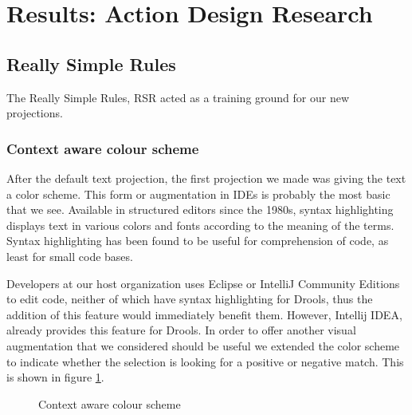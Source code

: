 \section{Results: Action Design Research}\label{section:Results_ADR}

\subsection{Really Simple Rules}

The Really Simple Rules, RSR acted as a training ground for our new projections.

\subsubsection{Context aware colour scheme}
After the default text projection, the first projection we made was giving the text a color scheme. 
This form or augmentation in IDEs is probably the most basic that we see. 
Available in structured editors since the 1980s\cite{cowlishaw1987lexx}, syntax highlighting displays text in various colors and fonts according to the meaning of the terms.
Syntax highlighting has been found to be useful for comprehension of code, as least for small code bases\cite{sarkar2015impact}.

Developers at our host organization uses Eclipse or IntelliJ Community Editions to edit code, neither of which have syntax highlighting for Drools, thus the addition of this feature would immediately benefit them.
However, Intellij IDEA, already provides this feature for Drools.
In order to offer another visual augmentation that we considered should be useful we extended the color scheme to indicate whether the selection is looking for a positive or negative match.
This is shown in figure \ref{fig:colorscheme}.

\begin{figure}[h]
    \centering
    \caption{Context aware colour scheme}
    \label{fig:colorscheme}
\end{figure}

